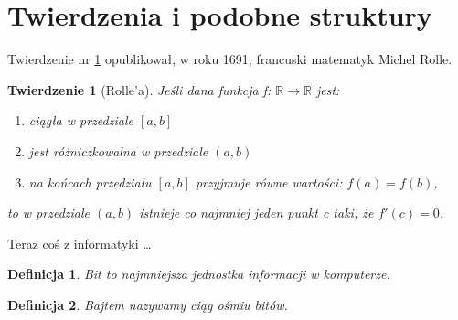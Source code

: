 \documentclass{agh-wi} %
\newtheorem{theorem}{Twierdzenie}
\newtheorem{definition}{Definicja}
\begin{document}
\section{Twierdzenia i podobne struktury}
Twierdzenie nr \ref{tw} opublikował, w roku 1691, francuski matematyk Michel Rolle.
\begin{theorem}[Rolle'a]
    \label{tw}
    Jeśli dana funkcja f: $\mathbb R \to \mathbb R$ jest:
    \begin{enumerate}
        \item ciągła w przedziale $[a,b]$
        \item jest różniczkowalna w przedziale $(a,b)$
        \item na końcach przedziału $[a,b]$ przyjmuje równe wartości: $f(a) = f(b)$,
    \end{enumerate}
    to w przedziale $(a,b)$ istnieje co najmniej jeden punkt c taki, że $f'(c) = 0$.
\end{theorem}

Teraz coś z informatyki \ldots
\begin{definition}
    Bit to najmniejsza jednostka informacji w komputerze.
\end{definition}
\begin{definition}
    Bajtem nazywamy ciąg ośmiu bitów.
\end{definition}
\backmatter %
\end{document}
